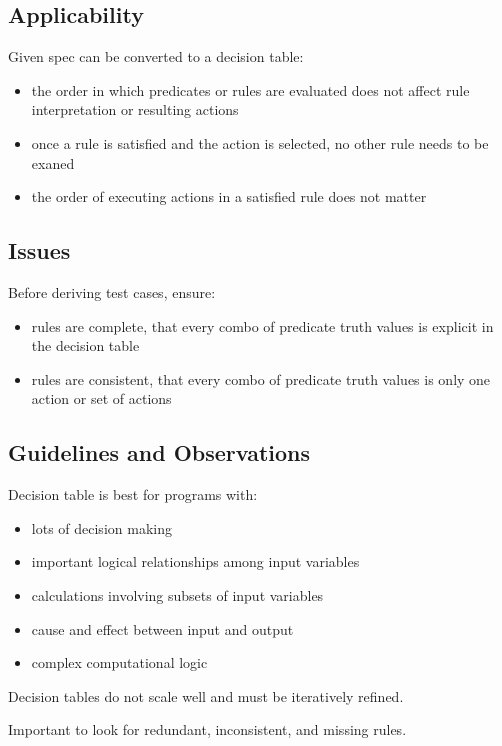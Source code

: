 \documentclass[11pt]{article}
\begin{document}
\subsection{Applicability}
\label{sec:org7c76fa4}
Given spec can be converted to a decision table:
\begin{itemize}
\item the order in which predicates or rules are evaluated does not affect rule
interpretation or resulting actions
\item once a rule is satisfied and the action is selected, no other rule needs to be
exaned
\item the order of executing actions in a satisfied rule does not matter
\end{itemize}
\subsection{Issues}
\label{sec:orgc7abb43}
Before deriving test cases, ensure:
\begin{itemize}
\item rules are complete, that every combo of predicate truth values is
explicit in the decision table
\item rules are consistent, that every combo of predicate truth values is only one
action or set of actions
\end{itemize}
\subsection{Guidelines and Observations}
\label{sec:org73c6c20}
Decision table is best for programs with:
\begin{itemize}
\item lots of decision making
\item important logical relationships among input variables
\item calculations involving subsets of input variables
\item cause and effect between input and output
\item complex computational logic
\end{itemize}

Decision tables do not scale well and must be iteratively refined.

Important to look for redundant, inconsistent, and missing rules.
\end{document}
